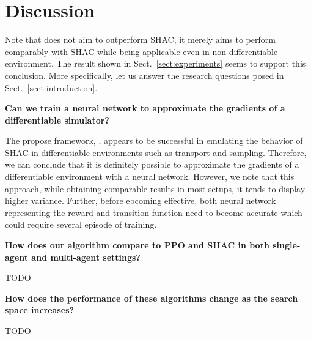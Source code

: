 \section{Discussion}

Note that \fname{} does not aim to outperform SHAC, it merely aims to perform comparably with SHAC while being applicable even in non-differentiable environment. The result shown in Sect.~\ref{sect:experiments} seems to support this conclusion. More specifically, let us answer the research questions posed in Sect.~\ref{sect:introduction}.

\begin{center}
 \textbf{Can we train a neural network to approximate the gradients of a differentiable simulator?}
\end{center}

The propose framework, \fname{}, appears to be successful in emulating the behavior of SHAC in differentiable environments such as transport and sampling. Therefore, we can conclude that it is definitely possible to approximate the gradients of a differentiable environment with a neural network. However, we note that this approach, while obtaining comparable results in most setups, it tends to display higher variance. Further, before ebcoming effective, both neural network representing the reward and transition function need to become accurate which could require several episode of training.

\begin{center}
 \textbf{How does our algorithm compare to PPO and SHAC in both single-agent and multi-agent settings?}
\end{center}
TODO

\begin{center}
 \textbf{How does the performance of these algorithms change as the search space increases?}
\end{center}
TODO
